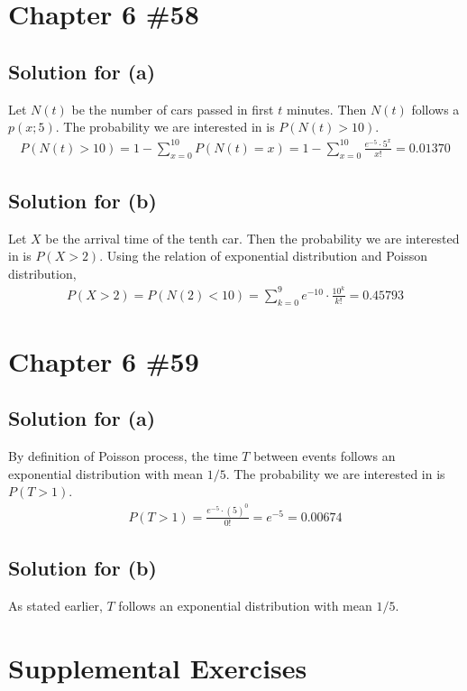 \documentclass{scrartcl}
\begin{document}
\section{Chapter 6 \#58}
\subsection{Solution for (a)}
Let \(N(t)\) be the number of cars passed in first \(t\) minutes. Then \(N(t)\)
follows a \(p(x; 5)\). The probability we are interested in is \(P(N(t) >
10)\).
\begin{align*}
  P(N(t) > 10)
  = 1 - \sum^{10}_{x = 0} P(N(t) = x)
  = 1 - \sum^{10}_{x = 0} \frac{e^{-5} \cdot 5^x}{x!}
  = 0.01370
\end{align*}

\subsection{Solution for (b)}
Let \(X\) be the arrival time of the tenth car. Then the probability we are
interested in is \(P(X > 2)\). Using the relation of exponential distribution
and Poisson distribution,
\begin{align*}
  P(X > 2)
  = P(N(2) < 10)
  = \sum^9_{k = 0} e^{-10} \cdot \frac{10^k}{k!}
  = 0.45793
\end{align*}

\section{Chapter 6 \#59}
\subsection{Solution for (a)}
By definition of Poisson process, the time \(T\) between events follows an
exponential distribution with mean \(1 / 5\). The probability we are interested
in is \(P(T > 1)\).
\begin{align*}
  P(T > 1)
  = \frac{e^{-5} \cdot (5)^0}{0!}
  = e^{-5}
  = 0.00674
\end{align*}

\subsection{Solution for (b)}
As stated earlier, \(T\) follows an exponential distribution with mean \(1 /
5\).

\section{Supplemental Exercises}
\end{document}
